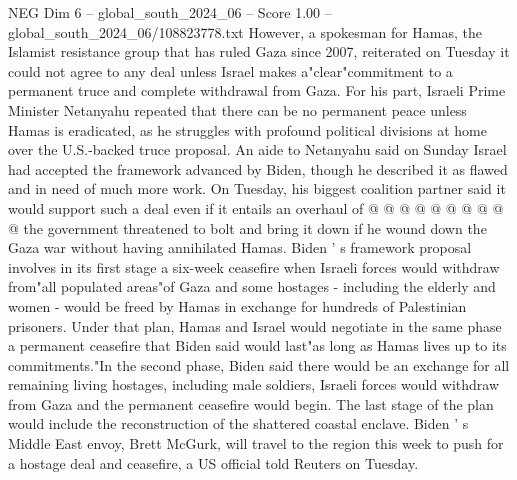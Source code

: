 \begin{textsample}{NEG Dim 6 – global\_south\_2024\_06 – Score 1.00 – global\_south\_2024\_06/108823778.txt}
However, a spokesman for Hamas, the Islamist resistance group that has ruled Gaza since 2007, reiterated on Tuesday it could not agree to any deal unless Israel makes a"clear"commitment to a permanent truce and complete withdrawal from Gaza.
For his part, Israeli Prime Minister Netanyahu repeated that there can be no permanent peace unless Hamas is eradicated, as he struggles with profound political divisions at home over the U.S.-backed truce proposal.
An aide to Netanyahu said on Sunday Israel had accepted the framework advanced by Biden, though he described it as flawed and in need of much more work.
On Tuesday, his biggest coalition partner said it would support such a deal even if it entails an overhaul of @ @ @ @ @ @ @ @ @ @ the government threatened to bolt and bring it down if he wound down the Gaza war without having annihilated Hamas.
Biden ' s framework proposal involves in its first stage a six-week ceasefire when Israeli forces would withdraw from"all populated areas"of Gaza and some hostages - including the elderly and women - would be freed by Hamas in exchange for hundreds of Palestinian prisoners.
Under that plan, Hamas and Israel would negotiate in the same phase a permanent ceasefire that Biden said would last"as long as Hamas lives up to its commitments."In the second phase, Biden said there would be an exchange for all remaining living hostages, including male soldiers, Israeli forces would withdraw from Gaza and the permanent ceasefire would begin.
The last stage of the plan would include the reconstruction of the shattered coastal enclave.
Biden ' s Middle East envoy, Brett McGurk, will travel to the region this week to push for a hostage deal and ceasefire, a US official told Reuters on Tuesday.

\end{textsample}
